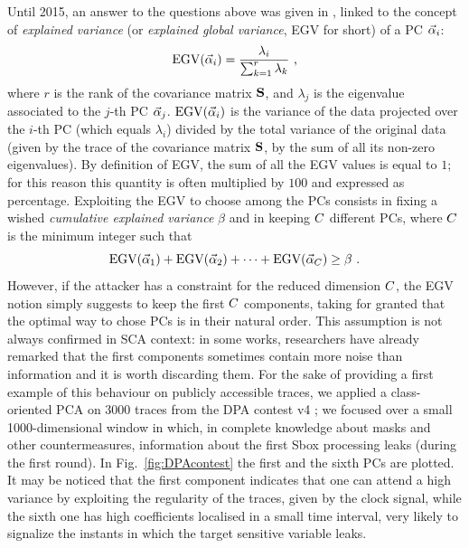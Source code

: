 Until 2015, an answer to the questions above was given in \cite{choudary2014efficient}, linked to the concept of {\em explained variance} (or {\em explained global variance}, EGV for short) of a PC $\vec{\alpha}_i$:
\begin{equation}\label{eq:EGV}
\mathrm{EGV}(\vec{\alpha}_i) =  \frac{\lambda_i}{\sum_{k=1}^r\lambda_k} \mbox{ ,}
\end{equation}
where $r$ is the rank of the covariance matrix $\textbf{S}$, and $\lambda_j$ is the eigenvalue associated to the $j$-th PC $\vec{\alpha}_j$. $\mathrm{EGV}(\vec{\alpha}_i)$ is the variance of the data projected over the $i$-th PC (which equals $\lambda_i$) divided by the total variance of the original data (given by the trace of the covariance matrix $\textbf{S}$, \ie by the sum of all its non-zero eigenvalues). By definition of EGV, the sum of all the EGV values is equal to $1$; for this reason this quantity is often multiplied by $100$ and expressed as percentage.
Exploiting the EGV to choose among the PCs consists in fixing a wished {\em cumulative explained variance} $\beta$ and in keeping $C$ different PCs, where $C$ is the minimum integer such that
\begin{equation}
\mbox{EGV}(\vec{\alpha}_1) +\mbox{EGV}(\vec{\alpha}_2) + \dots +\mbox{EGV}(\vec{\alpha}_C) \geq \beta \mbox{ .}
\end{equation}
However, if the attacker has a constraint for the reduced dimension $C$, the EGV notion simply suggests to keep the first $C$ components, taking for granted that the optimal way to chose PCs is in their natural order. This assumption is not always confirmed in SCA context: in some works, researchers have already remarked that the first components sometimes contain more noise than information \cite{Batina2012,specht} and it is worth discarding them. For the sake of providing a first example of this behaviour on publicly accessible traces, we applied a class-oriented PCA on 3000 traces from the DPA contest v4 \cite{DPAcontest}; we focused over a small 1000-dimensional window in which, in complete knowledge about masks and other countermeasures, information about the first Sbox processing leaks (during the first round). In Fig.~\ref{fig:DPAcontest} the first and the sixth PCs are plotted. It may be noticed that the first component indicates that one can attend a high variance by exploiting the regularity of the traces, given by the clock signal, while the sixth one has high coefficients localised in a small time interval, very likely to signalize the instants in which the target sensitive variable leaks.

